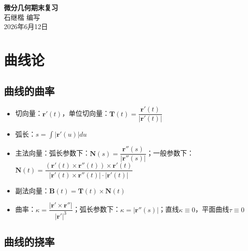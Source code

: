 \documentclass{article}
\begin{document}
	\begin{center}
		{\LARGE \textbf{微分几何期末复习}} \\[0.5cm]
		{\large 石继楷 \quad 编写} \\[0.3cm]
		{\large 2026年6月12日}
	\end{center}
	
	\section{曲线论}
	\subsection{曲线的曲率}
	\begin{itemize}
		\item 切向量：$\boldsymbol{r}'(t)$，单位切向量：$\boldsymbol{T}(t)=\dfrac{\boldsymbol{r}'(t)}{|\boldsymbol{r}'(t)|}$
		\item 弧长：$s=\int|\boldsymbol{r}'(u)|du$
		\item 主法向量：弧长参数下：$\boldsymbol{N}(s)=\dfrac{\boldsymbol{r}''(s)}{|\boldsymbol{r}''(s)|}$；一般参数下：$\boldsymbol{N}(t)=\dfrac{(\boldsymbol{r}'(t)\times\boldsymbol{r}''(t))\times\boldsymbol{r}'(t)}{|\boldsymbol{r}'(t)\times\boldsymbol{r}''(t)|\cdot|\boldsymbol{r}'(t)|}$
		\item 副法向量：$\boldsymbol{B}(t)=\boldsymbol{T}(t)\times\boldsymbol{N}(t)$
		\item 曲率：$\kappa=\dfrac{|\boldsymbol{r}'\times\boldsymbol{r}''|}{|\boldsymbol{r}'|^3}$；弧长参数下：$\kappa=|\boldsymbol{r}''(s)|$；直线$\kappa\equiv0$，平面曲线$\tau\equiv0$
	\end{itemize}
	
	\subsection{曲线的挠率}
\end{document}
